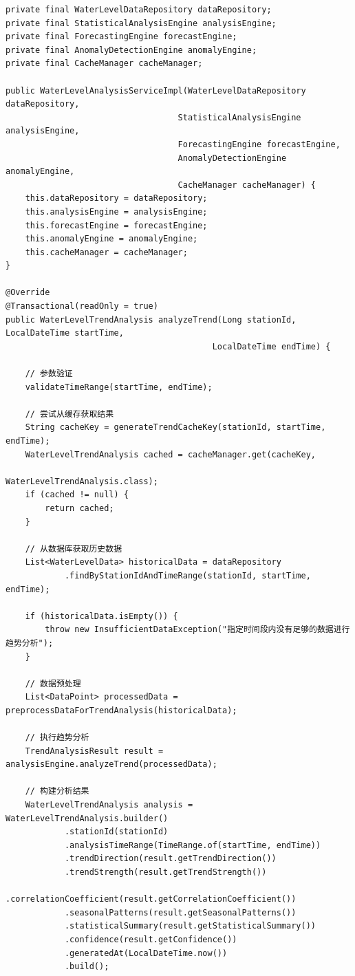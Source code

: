 \begin{verbatim}
private final WaterLevelDataRepository dataRepository;
private final StatisticalAnalysisEngine analysisEngine;
private final ForecastingEngine forecastEngine;
private final AnomalyDetectionEngine anomalyEngine;
private final CacheManager cacheManager;

public WaterLevelAnalysisServiceImpl(WaterLevelDataRepository dataRepository,
                                   StatisticalAnalysisEngine analysisEngine,
                                   ForecastingEngine forecastEngine,
                                   AnomalyDetectionEngine anomalyEngine,
                                   CacheManager cacheManager) {
    this.dataRepository = dataRepository;
    this.analysisEngine = analysisEngine;
    this.forecastEngine = forecastEngine;
    this.anomalyEngine = anomalyEngine;
    this.cacheManager = cacheManager;
}

@Override
@Transactional(readOnly = true)
public WaterLevelTrendAnalysis analyzeTrend(Long stationId, LocalDateTime startTime, 
                                          LocalDateTime endTime) {
    
    // 参数验证
    validateTimeRange(startTime, endTime);
    
    // 尝试从缓存获取结果
    String cacheKey = generateTrendCacheKey(stationId, startTime, endTime);
    WaterLevelTrendAnalysis cached = cacheManager.get(cacheKey, 
                                                     WaterLevelTrendAnalysis.class);
    if (cached != null) {
        return cached;
    }
    
    // 从数据库获取历史数据
    List<WaterLevelData> historicalData = dataRepository
            .findByStationIdAndTimeRange(stationId, startTime, endTime);
    
    if (historicalData.isEmpty()) {
        throw new InsufficientDataException("指定时间段内没有足够的数据进行趋势分析");
    }
    
    // 数据预处理
    List<DataPoint> processedData = preprocessDataForTrendAnalysis(historicalData);
    
    // 执行趋势分析
    TrendAnalysisResult result = analysisEngine.analyzeTrend(processedData);
    
    // 构建分析结果
    WaterLevelTrendAnalysis analysis = WaterLevelTrendAnalysis.builder()
            .stationId(stationId)
            .analysisTimeRange(TimeRange.of(startTime, endTime))
            .trendDirection(result.getTrendDirection())
            .trendStrength(result.getTrendStrength())
            .correlationCoefficient(result.getCorrelationCoefficient())
            .seasonalPatterns(result.getSeasonalPatterns())
            .statisticalSummary(result.getStatisticalSummary())
            .confidence(result.getConfidence())
            .generatedAt(LocalDateTime.now())
            .build();
    

\end{verbatim}
